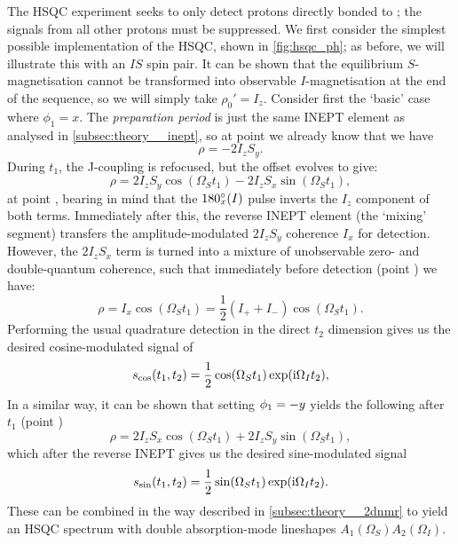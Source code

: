 The HSQC experiment seeks to only detect protons directly bonded to \carbon{}; the signals from all other protons must be suppressed.
We first consider the simplest possible implementation of the HSQC, shown in \cref{fig:hsqc_ph}; as before, we will illustrate this with an $IS$ spin pair.
It can be shown that the equilibrium $S$-magnetisation cannot be transformed into observable $I$-magnetisation at the end of the sequence, so we will simply take $\rho_0' = I_z$.
Consider first the `basic' case where $\phi_1 = x$.
The \textit{preparation period} is just the same INEPT element as analysed in \cref{subsec:theory__inept}, so at point  we already know that we have
\begin{equation}
    \label{eq:hsqc_ph_rho_1}
    \rho = -2I_zS_y.
\end{equation}
During $t_1$, the J-coupling is refocused, but the offset evolves to give:
\begin{equation}
    \label{eq:hsqc_ph_after_t1}
    \rho = 2I_zS_y\cos(\Omega_S t_1) - 2I_zS_x \sin(\Omega_S t_1),
\end{equation}
at point , bearing in mind that the $\angang{180}{x}(I)$ pulse inverts the $I_z$ component of both terms.
Immediately after this, the reverse INEPT element (the `mixing' segment) transfers the amplitude-modulated $2I_zS_y$ coherence $I_x$ for detection.
However, the $2I_zS_x$ term is turned into a mixture of unobservable zero- and double-quantum coherence, such that immediately before detection (point ) we have:
\begin{equation}
    \label{eq:hsqc_ph_detection}
    \rho = I_x\cos(\Omega_S t_1) = \frac{1}{2}(I_+ + I_-)\cos(\Omega_S t_1).
\end{equation}
Performing the usual quadrature detection in the direct $t_2$ dimension gives us the desired cosine-modulated signal of
\begin{equation}
    \label{eq:hsqc_cos_signal}
    s_\text{cos}(t_1, t_2) = \frac{1}{2}\cos(\Omega_S t_1)\exp(\mathrm{i} \Omega_I t_2),
\end{equation}
In a similar way, it can be shown that setting $\phi_1 = -y\/$ yields the following after $t_1$ (point )
\begin{equation}
    \label{eq:hsqc_ph_after_t1_sin}
    \rho = 2I_zS_x\cos(\Omega_S t_1) + 2I_zS_y \sin(\Omega_S t_1),
\end{equation}
which after the reverse INEPT gives us the desired sine-modulated signal
\begin{equation}
    \label{eq:hsqc_sin_signal}
    s_\text{sin}(t_1, t_2) = \frac{1}{2}\sin(\Omega_S t_1)\exp(\mathrm{i} \Omega_I t_2).
\end{equation}
These can be combined in the way described in \cref{subsec:theory__2dnmr} to yield an HSQC spectrum with double absorption-mode lineshapes $A_1(\Omega_S)A_2(\Omega_I)$.

